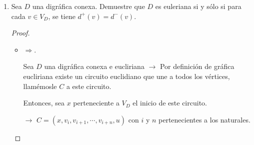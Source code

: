 \documentclass{article}
\begin{document}
\begin{enumerate}
\begin{proof}
\begin{itemize}
      Entonces tenemos que:
      \begin{equation*}
        \begin{split}
          E_{G}
          & = \bigcup_{i=1}^{k} E_{C_{i}} \cup E_{P} \\
          & = E_{P} \cup \bigcup_{i=1}^{k} E_{C_{i}}
        \end{split}
      \end{equation*}

    \item $(c) \Longrightarrow (a)$.

      Esto es inmediato ya que \textit{por hipótesis}, existe un paseo $P$ tal que:
      $$E_{G} = E_{P} \cup \bigcup_{i=1}^{k} E_{C_{i}}$$

      En particular si $G$ no tiene ciclos, es decir, $\displaystyle \bigcup_{i=1}^{k} E_{C_{i}} = \emptyset$ tenemos que:
      \begin{equation*}
        \begin{split}
          E_{G}
          & = E_{P} \cup \bigcup_{i=1}^{k} E_{C_{i}} \\
          & = E_{P} \cup \emptyset \\
          & = E_{P}
        \end{split}
      \end{equation*}

      Así, si $E_{G} = E_{P}$ implica que hay un paseo euleriano en $G$ (por definición de \textbf{paseo euleriano}).

      Por lo tanto, queda demostrado que las afirmaciones son equivalentes.
    \end{itemize}
  \end{proof}

\item Sea $D$ una digr\'afica conexa. Demuestre que $D$ es
  euleriana si y s\'olo si  para cada $v \in V_D$, se tiene
  $d^+(v) = d^-(v)$.

  \begin{proof}
    \begin{itemize}
    \item $\Longrightarrow$.

      Sea $D$ una digráfica conexa e eucliriana $\rightarrow$ Por definición de gráfica eucliriana existe un circuito euclidiano que une a todos los vértices, llamémosle $C$ a este circuito.

      Entonces, sea $x$ perteneciente a $V_D$ el inicio de este circuito.

      $\rightarrow$ $C = (x,v_i, v_{i+1}, \cdots, v_{i+n}, u)$ con $i$ y $n$ pertenecientes a los naturales.


\end{itemize}
\end{proof}
\end{enumerate}
\end{document}
